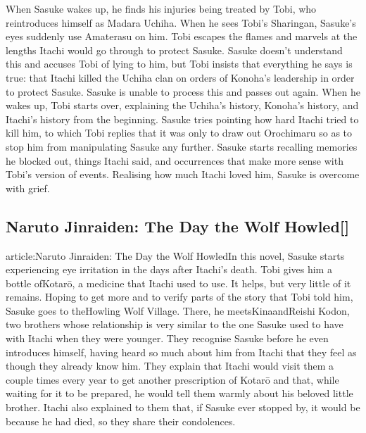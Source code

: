 \documentclass[a4paper,12pt]{article}
\begin{document}
When Sasuke wakes up, he finds his injuries being treated by Tobi, who reintroduces himself as Madara Uchiha. When he sees Tobi's Sharingan, Sasuke's eyes suddenly use Amaterasu on him. Tobi escapes the flames and marvels at the lengths Itachi would go through to protect Sasuke. Sasuke doesn't understand this and accuses Tobi of lying to him, but Tobi insists that everything he says is true: that Itachi killed the Uchiha clan on orders of Konoha's leadership in order to protect Sasuke. Sasuke is unable to process this and passes out again. When he wakes up, Tobi starts over, explaining the Uchiha's history, Konoha's history, and Itachi's history from the beginning. Sasuke tries pointing how hard Itachi tried to kill him, to which Tobi replies that it was only to draw out Orochimaru so as to stop him from manipulating Sasuke any further. Sasuke starts recalling memories he blocked out, things Itachi said, and occurrences that make more sense with Tobi's version of events. Realising how much Itachi loved him, Sasuke is overcome with grief.\\ \par \vspace{0.5cm}

\subsection*{Naruto Jinraiden: The Day the Wolf Howled[]}\n\nMain article:Naruto Jinraiden: The Day the Wolf HowledIn this novel, Sasuke starts experiencing eye irritation in the days after Itachi's death. Tobi gives him a bottle ofKotarō, a medicine that Itachi used to use. It helps, but very little of it remains. Hoping to get more and to verify parts of the story that Tobi told him, Sasuke goes to theHowling Wolf Village. There, he meetsKinaandReishi Kodon, two brothers whose relationship is very similar to the one Sasuke used to have with Itachi when they were younger. They recognise Sasuke before he even introduces himself, having heard so much about him from Itachi that they feel as though they already know him. They explain that Itachi would visit them a couple times every year to get another prescription of Kotarō and that, while waiting for it to be prepared, he would tell them warmly about his beloved little brother. Itachi also explained to them that, if Sasuke ever stopped by, it would be because he had died, so they share their condolences.\\ \par \vspace{0.5cm}
\end{document}
